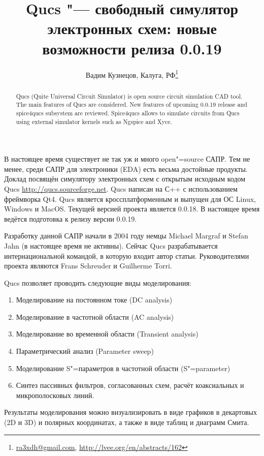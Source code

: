 \documentclass[10pt, a5paper]{article}
\begin{document}
\title{Qucs "--- свободный симулятор электронных схем: новые возможности релиза 0.0.19}
\author{Вадим Кузнецов, Калуга, РФ\footnote{\url{ra3xdh@gmail.com}, \url{http://lvee.org/en/abstracts/162}}}
\maketitle
\begin{abstract}
Qucs (Quite Universal Circuit Simulator) is open source cir\-cuit simulation CAD tool. The main features of Qucs are conside\-red. New features of upcoming 0.0.19 release and spice4qucs subsystem are reviewed. Spice4qucs allows to simulate circuits from Qucs using external simulator kernels such as Ngspice and Xyce.
\end{abstract}
В настоящее время существует не так уж и много open"=source САПР. Тем не менее, среди САПР для электроники (EDA) есть весьма достойные продукты. Доклад посвящён симулятору электронных схем с открытым исходным кодом Qucs \url{http://qucs.sourceforge.net}. Qucs написан на С++ с использованием фреймворка Qt4. Qucs является кроссплатформенным и выпущен для ОС Linux, Windows и MacOS. Текущей версией проекта является 0.0.18. В настоящее время ведётся подготовка к релизу версии 0.0.19.

Разработку данной САПР начали в 2004 году немцы Michael Margraf и Stefan Jahn (в настоящее время не активны). Сейчас Qucs разрабатывается интернациональной командой, в которую входит автор статьи. Руководителями проекта являются Frans Schreuder и Guilherme Torri.

Qucs позволяет проводить следующие виды моделирования:

\begin{enumerate}
\item Моделирование на постоянном токе (DC analysis)
\item Моделирование в частотной области (AC analysis)
\item Моделирование во временной области (Transient analysis)
\item Параметрический анализ (Parameter sweep)
\item Моделирование S"=параметров в частотной области (S"=parame\-ter)
\item Синтез пассивных фильтров, согласованных схем, расчёт коаксиальных 
и микрополосковых линий.
\end{enumerate}

Результаты моделирования можно визуализировать в виде графиков в декартовых (2D и 3D) и полярных координатах, а также в виде таблиц и диаграмм Смита.
\end{document}

